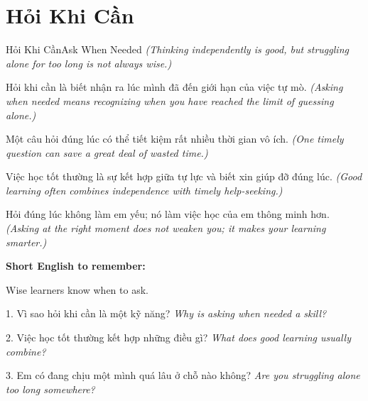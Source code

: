 \section{Hỏi Khi Cần}
\begin{truyen}{Hỏi Khi Cần}{Ask When Needed}
\textit{(Thinking independently is good, but struggling alone for too long is not always wise.)}

Hỏi khi cần là biết nhận ra lúc mình đã đến giới hạn của việc tự mò.
\textit{(Asking when needed means recognizing when you have reached the limit of guessing alone.)}

Một câu hỏi đúng lúc có thể tiết kiệm rất nhiều thời gian vô ích.
\textit{(One timely question can save a great deal of wasted time.)}

Việc học tốt thường là sự kết hợp giữa tự lực và biết xin giúp đỡ đúng lúc.
\textit{(Good learning often combines independence with timely help-seeking.)}
\end{truyen}

\begin{baihoc}
Hỏi đúng lúc không làm em yếu; nó làm việc học của em thông minh hơn.
\textit{(Asking at the right moment does not weaken you; it makes your learning smarter.)}
\end{baihoc}

\begin{ghinhoanh}
\textbf{Short English to remember:}

Wise learners know when to ask.

\end{ghinhoanh}

\begin{tuhocnhanh}
1. Vì sao hỏi khi cần là một kỹ năng? \textit{Why is asking when needed a skill?}

2. Việc học tốt thường kết hợp những điều gì? \textit{What does good learning usually combine?}

3. Em có đang chịu một mình quá lâu ở chỗ nào không? \textit{Are you struggling alone too long somewhere?}
\end{tuhocnhanh}
\ngancach

